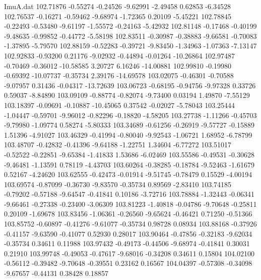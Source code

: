 \begin{filecontents}{ImuA.dat}
 102.71876   -0.55274   -0.24526   -9.62991   -2.49458    0.62853   -6.34528
 102.76537   -0.16271   -0.59462   -9.68974   -1.72365    0.20109   -5.45221
 102.78845   -0.22493   -0.53480   -9.61197   -1.55572   -0.24163   -5.42932
 102.81148   -0.17468   -0.40199   -9.48635   -0.99852   -0.44772   -5.58198
 102.83511   -0.30987   -0.38883   -9.66581   -0.70083   -1.37895   -5.79570
 102.88159   -0.52283   -0.39721   -9.83450   -1.34963   -1.07363   -7.13147
 102.92833   -0.93200    0.21176   -9.02932   -0.44894   -0.01264  -10.26864
 102.97487   -0.70469   -0.36012  -10.58585    3.20727    6.16246  -14.00881
 102.99810   -0.19980   -0.69392  -10.07737   -0.35734    2.39176  -14.69578
 103.02075   -0.46301   -0.70588   -9.07957    0.31436   -0.04317  -13.72639
 103.06723   -0.68195   -0.94756   -9.97328    0.33726    0.59037   -8.84890
 103.09109   -0.88774   -0.82074   -9.73400    0.03194    1.49870   -7.55129
 103.18397   -0.09691   -0.10887  -10.45065    0.37542   -0.02027   -5.78043
 103.25444   -1.04447   -0.59701   -9.96012   -0.82296   -0.18820   -4.58205
 103.27738   -1.11266   -0.45703   -9.79980   -1.09774    0.58274   -5.80333
 103.34689   -0.61256   -0.26919   -9.57727   -0.15889    1.51396   -4.91027
 103.46329   -0.41994   -0.80040   -9.92543   -1.06721    1.68952   -6.78799
 103.48707   -0.42832   -0.41396   -9.64188   -1.22751    1.34604   -6.77272
 103.51017   -0.52522   -0.22851   -9.65384   -1.41833    1.53686   -6.02469
 103.55586   -0.49531   -0.30628   -9.46481   -1.13591    0.78119   -4.43703
 103.60264   -0.38285   -0.18784   -9.52463   -1.61679    0.52167   -4.24620
 103.62555   -0.42473   -0.01914   -9.51745   -0.78479    0.15529   -4.00194
 103.69574   -0.87099   -0.36730   -9.83570   -0.35734    0.89569   -2.83410
 103.74185   -0.79202   -0.57188   -9.64547   -0.41841    0.10186   -3.72716
 103.78884   -1.32443   -0.06341   -9.66461   -0.27338   -0.23400   -3.06309
 103.81223   -1.40818   -0.04786   -9.70648   -0.25811    0.20109   -1.69678
 103.83456   -1.06361   -0.26560   -9.65624   -0.46421    0.71250   -0.51366
 103.85752   -0.60897   -0.41276   -9.61077   -0.35734    0.98728    0.08934
 103.88168   -0.37926   -0.41157   -9.63590   -0.41077    0.52930    0.28017
 103.90464   -0.47856   -0.32183   -9.62034   -0.35734    0.34611    0.11988
 103.97432   -0.49173   -0.44506   -9.68974   -0.41841    0.30031    0.21910
 103.99748   -0.49053   -0.47617   -9.68016   -0.34208    0.34611    0.15804
 104.02100   -0.56112   -0.39482   -9.70648   -0.39551    0.23162    0.16567
 104.04397   -0.57308   -0.34098   -9.67657   -0.44131    0.38428    0.18857

\end{filecontents}

